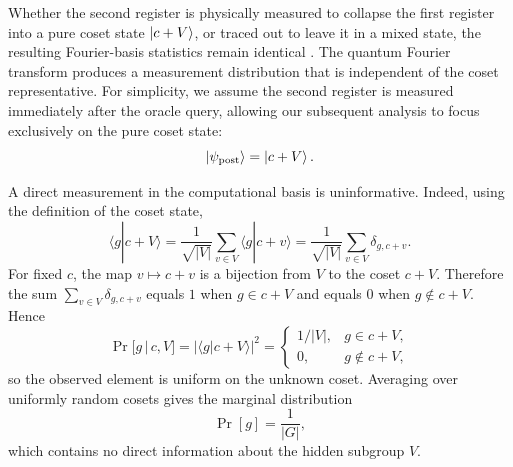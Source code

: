 Whether the second register is physically measured to collapse the first register into a pure coset state $\ket{c+V}$, or traced out to leave it in a mixed state, the resulting Fourier-basis statistics remain identical \cite{NielsenChuang2000}. The quantum Fourier transform produces a measurement distribution that is independent of the coset representative. For simplicity, we assume the second register is measured immediately after the oracle query, allowing our subsequent analysis to focus exclusively on the pure coset state:
\begin{equation}
    \ket{\psi_{\text{post}}} = \ket{c+V}.
\end{equation}


A direct measurement in the computational basis is uninformative. Indeed, using the definition of the coset state,
\begin{equation}
    \langle g|c+V\rangle
    = \frac{1}{\sqrt{|V|}} \sum_{v \in V} \langle g|c+v\rangle
    = \frac{1}{\sqrt{|V|}} \sum_{v \in V} \delta_{g,c+v}.
\end{equation}
For fixed $c$, the map $v \mapsto c+v$ is a bijection from $V$ to the coset $c+V$. Therefore the sum $\sum_{v \in V} \delta_{g,c+v}$ equals $1$ when $g \in c+V$ and equals $0$ when $g \notin c+V$. Hence
\begin{equation}
    \Pr[g\,|\,c,V] = |\langle g|c+V\rangle|^2 =
    \begin{cases}
        1/|V|,& g\in c+V,\\
        0,& g\notin c+V,
    \end{cases}
\end{equation}
so the observed element is uniform on the unknown coset. Averaging over uniformly random cosets gives the marginal distribution
\begin{equation}
    \Pr[g]=\frac{1}{|G|},
\end{equation}
which contains no direct information about the hidden subgroup $V$.

